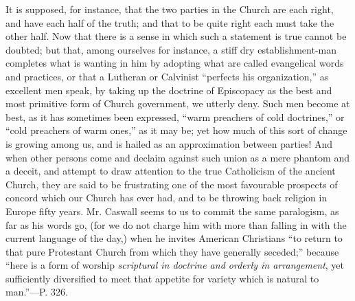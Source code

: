It is supposed, for instance, that the two
parties in the Church are each right, and have each half of the truth;
and that to be quite right each must take the other half. Now that
there is a sense in which such a statement is true cannot be doubted;
but that, among ourselves for instance, a stiff dry establishment-man
completes what is wanting in him by adopting what are called
evangelical words and practices, or that a Lutheran or Calvinist ``perfects
his organization,'' as excellent men speak, by taking up the doctrine
of Episcopacy as the best and most primitive form of Church
government, we utterly deny. Such men become at best, as it has
sometimes been expressed, ``warm preachers of cold doctrines,'' or ``cold
preachers of warm ones,'' as it may be; yet how much of this sort of
change is growing among us, and is hailed as an approximation between
parties! And when other persons come and declaim against such union as
a mere phantom and a deceit, and attempt to draw attention to the true
Catholicism of the ancient Church, they are said to be frustrating one
of the most favourable prospects of concord which our Church has ever
had, and to be throwing back religion in Europe fifty years. Mr.
Caswall seems to us to commit the same paralogism, as far as his words
go, (for we do not charge him with more than falling in with the
current language of the day,) when he invites American
Christians ``to return to that pure Protestant Church from which they
have generally seceded;'' because ``here is a form of worship \emph{scriptural
in doctrine and orderly in arrangement}, yet sufficiently
diversified to meet that appetite for variety which is natural to man.''—P.
326.

